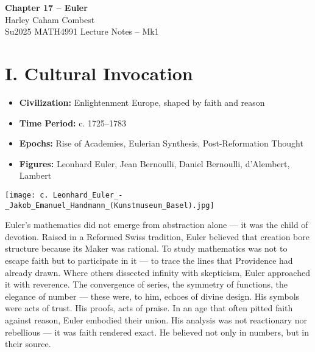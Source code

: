 \documentclass[9pt]{article}
\begin{document}
\begin{center}
\Large\textbf{Chapter 17 – Euler} \\
\large Harley Caham Combest \\
\large Su2025 MATH4991 Lecture Notes – Mk1
\end{center}

\vspace{1em}

\section*{I. Cultural Invocation}
\begin{itemize}
  \item \textbf{Civilization:} Enlightenment Europe, shaped by faith and reason
  \item \textbf{Time Period:} c. 1725--1783
  \item \textbf{Epochs:} Rise of Academies, Eulerian Synthesis, Post-Reformation Thought
  \item \textbf{Figures:} Leonhard Euler, Jean Bernoulli, Daniel Bernoulli, d'Alembert, Lambert
\end{itemize}

\begin{center}
\texttt{[image: c. Leonhard\_Euler\_-\_Jakob\_Emanuel\_Handmann\_(Kunstmuseum\_Basel).jpg]}
\end{center}

\vspace{1em}

Euler’s mathematics did not emerge from abstraction alone — it was the child of devotion. Raised in a Reformed Swiss tradition, Euler believed that creation bore structure because its Maker was rational. To study mathematics was not to escape faith but to participate in it — to trace the lines that Providence had already drawn.
\vspace{1em}
\noindent
Where others dissected infinity with skepticism, Euler approached it with reverence. The convergence of series, the symmetry of functions, the elegance of number — these were, to him, echoes of divine design. His symbols were acts of trust. His proofs, acts of praise.
\vspace{1em}
\noindent
In an age that often pitted faith against reason, Euler embodied their union. His analysis was not reactionary nor rebellious — it was faith rendered exact. He believed not only in numbers, but in their source.

\newpage
\end{document}
